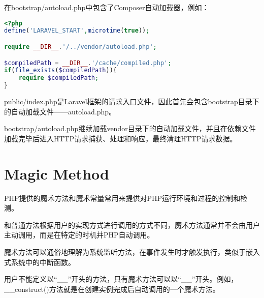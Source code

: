 在bootstrap/autoload.php中包含了Composer自动加载器，例如：


\begin{lstlisting}[language=PHP]
<?php
define('LARAVEL_START',microtime(true));

require __DIR__.'/../vendor/autoload.php';

$compiledPath = __DIR__.'/cache/compiled.php';
if(file_exists($compiledPath)){
    require $compiledPath;
}
\end{lstlisting}

public/index.php是Laravel框架的请求入口文件，因此首先会包含bootstrap目录下的自动加载文件——autoload.php。

bootstrap/autoload.php继续加载vendor目录下的自动加载文件，并且在依赖文件加载完毕后进入HTTP请求捕获、处理和响应，最终清理HTTP请求数据。


\section{Magic Method}

PHP提供的魔术方法和魔术常量常用来提供对PHP运行环境和过程的控制和检测。

和普通方法根据用户的实现方式进行调用的方式不同，魔术方法通常并不会由用户主动调用，而是在特定的时机并PHP自动调用。

魔术方法可以通俗地理解为系统监听方法，在事件发生时才触发执行，类似于嵌入式系统中的中断函数。

用户不能定义以“\_\_”开头的方法，只有魔术方法可以以“\_\_”开头。例如，\_\_construct()方法就是在创建实例完成后自动调用的一个魔术方法。


